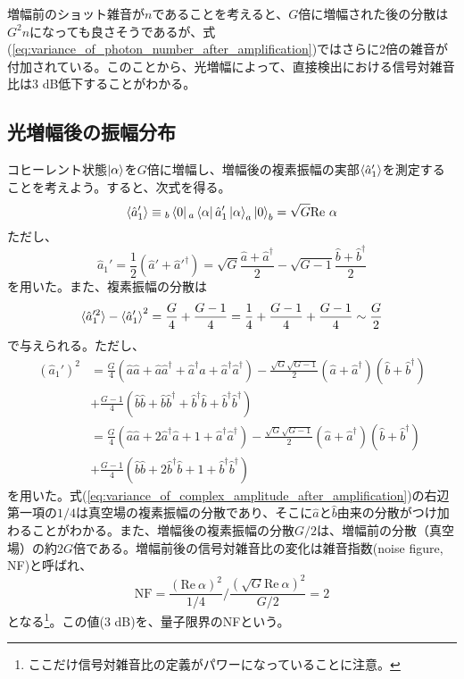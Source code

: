 増幅前のショット雑音が$n$であることを考えると、$G$倍に増幅された後の分散は$G^2n$になっても良さそうであるが、式(\ref{eq:variance_of_photon_number_after_amplification})ではさらに2倍の雑音が付加されている。このことから、光増幅によって、直接検出における信号対雑音比は3 dB低下することがわかる。

\subsection{光増幅後の振幅分布}
コヒーレント状態$\ket \alpha$を$G$倍に増幅し、増幅後の複素振幅の実部$\braket{\hat a_1'}$を測定することを考えよう。すると、次式を得る。
\begin{equation}
  \braket{\hat a_1'} \equiv {}_b\bra 0 {}_a \bra \alpha \hat a_1'\ket \alpha_a\ket 0_b = \sqrt G \mathrm {Re} \ \alpha
\end{equation}
ただし、
\begin{equation}
  \hat a _1' = \frac{1}{2}(\hat a' + \hat a'^\dagger) = \sqrt G \frac{\hat a + \hat a^\dagger}{2} - \sqrt{G-1} \frac{\hat b + \hat b^\dagger}{2}
\end{equation}
を用いた。また、複素振幅の分散は
\begin{equation}
  \braket{\hat a_1'^2} - \braket{\hat a_1'}^2 = \frac G 4 + \frac{G-1}{4} = \frac{1}{4} + \frac{G-1}{4} + \frac{G-1}{4} \sim \frac G 2
  \label{eq:variance_of_complex_amplitude_after_amplification}
\end{equation}
で与えられる。ただし、
\begin{equation}
\begin{aligned}
	(\hat a_1')^2 &= \frac G 4 (\hat a \hat a + \hat a \hat a^\dagger + \hat a^\dagger \hat a + \hat a^\dagger \hat a^\dagger) - \frac{\sqrt G \sqrt{G - 1}} 2 (\hat a + \hat a^\dagger)(\hat b + \hat b^\dagger) \\
	&+ \frac{G - 1}{4} (\hat b \hat b + \hat b \hat b^\dagger + \hat b^\dagger \hat b + \hat b^\dagger \hat b^\dagger) \\
	&= \frac G 4 (\hat a \hat a + 2\hat a^\dagger \hat a + 1 + \hat a^\dagger \hat a^\dagger) - \frac{\sqrt G \sqrt{G - 1}} 2 (\hat a + \hat a^\dagger)(\hat b + \hat b^\dagger) \\
	&+ \frac{G - 1}{4} (\hat b \hat b + 2\hat b^\dagger \hat b + 1 + \hat b^\dagger \hat b^\dagger) 
\end{aligned}
\end{equation}
を用いた。式(\ref{eq:variance_of_complex_amplitude_after_amplification})の右辺第一項の$1 / 4$は真空場の複素振幅の分散であり、そこに$\hat a$と$\hat b$由来の分散がつけ加わることがわかる。また、増幅後の複素振幅の分散$G / 2$は、増幅前の分散（真空場）の約$2G$倍である。増幅前後の信号対雑音比の変化は雑音指数(noise figure, NF)と呼ばれ、
\begin{equation}
\mathrm{NF} = \frac{(\mathrm{Re} \ \alpha)^2}{1/4}/ \frac{(\sqrt G \mathrm{Re} \ \alpha)^2}{G/2} = 2
\end{equation}
となる\footnote{ここだけ信号対雑音比の定義がパワーになっていることに注意。}。この値(3 dB)を、量子限界のNFという。

